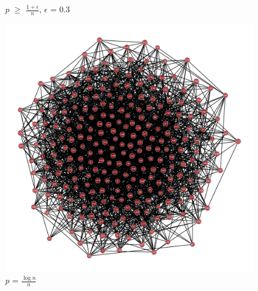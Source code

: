 \documentclass{article}
\begin{document}
\begin{figure}[!htb]
  \caption*{$p$ $\geq$ $\frac{1+\epsilon}{n}$,  $\epsilon$ = 0.3}
\endminipage\hfill
{}%
  \includegraphics[width=\linewidth]{ER_DS.png}
  \caption*{$p$ = $\frac{\log{}n}{n}$}
\endminipage
\end{figure}
\end{document}
